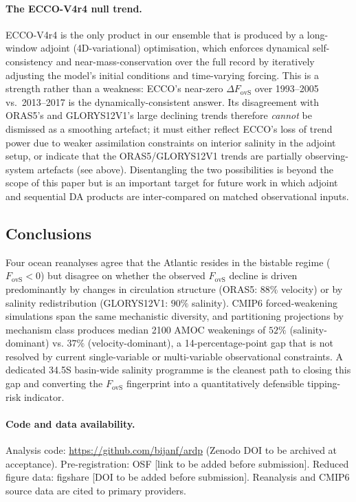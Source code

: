 \documentclass[12pt,a4paper]{article}
\newcommand{\Fovs}{F_\mathrm{ovS}}
\begin{document}
\paragraph{The ECCO-V4r4 null trend.}
ECCO-V4r4 is the only product in our ensemble that is produced by a
long-window adjoint (4D-variational) optimisation, which enforces
dynamical self-consistency and near-mass-conservation over the
full record by iteratively adjusting the model's initial
conditions and time-varying forcing. This is a strength rather than
a weakness: ECCO's near-zero $\Delta\Fovs$ over 1993--2005 vs.\
2013--2017 is the dynamically-consistent answer. Its disagreement
with ORAS5's and GLORYS12V1's large declining trends therefore
\emph{cannot} be dismissed as a smoothing artefact; it must either
reflect ECCO's loss of trend power due to weaker assimilation
constraints on interior salinity in the adjoint setup, or indicate
that the ORAS5/GLORYS12V1 trends are partially observing-system
artefacts (see above). Disentangling the two possibilities is
beyond the scope of this paper but is an important target for
future work in which adjoint and sequential DA products are
inter-compared on matched observational inputs.

\subsection*{Conclusions}
Four ocean reanalyses agree that the Atlantic resides in the bistable
regime ($\Fovs < 0$) but disagree on whether the observed $\Fovs$
decline is driven predominantly by changes in circulation structure
(ORAS5: $88\%$ velocity) or by salinity redistribution (GLORYS12V1:
$90\%$ salinity). CMIP6 forced-weakening simulations span the same
mechanistic diversity, and partitioning projections by mechanism class
produces median 2100 AMOC weakenings of $52\%$ (salinity-dominant) vs.
$37\%$ (velocity-dominant), a 14-percentage-point gap that is not
resolved by current single-variable or multi-variable observational
constraints. A dedicated 34.5\textdegree S basin-wide salinity
programme is the cleanest path to closing this gap and converting the
$\Fovs$ fingerprint into a quantitatively defensible tipping-risk
indicator.

\paragraph{Code and data availability.}
Analysis code: \url{https://github.com/bijanf/ardp} (Zenodo DOI to be
archived at acceptance). Pre-registration: OSF [link to be added
before submission]. Reduced figure data: figshare [DOI to be added
before submission]. Reanalysis and CMIP6 source data are cited to
primary providers.
\end{document}
